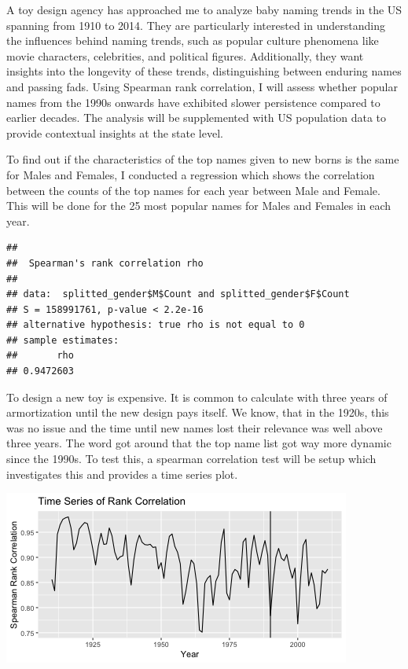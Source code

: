 \documentclass[11pt,preprint, authoryear]{elsarticle}
\let\origfigure\figure
\let\endorigfigure\endfigure
\renewenvironment{figure}[1][2] {
    \expandafter\origfigure\expandafter[H]
} {
    \endorigfigure
}
\numberwithin{equation}{section}
\numberwithin{figure}{section}
\numberwithin{table}{section}
\begin{document}
A toy design agency has approached me to analyze baby naming trends in
the US spanning from 1910 to 2014. They are particularly interested in
understanding the influences behind naming trends, such as popular
culture phenomena like movie characters, celebrities, and political
figures. Additionally, they want insights into the longevity of these
trends, distinguishing between enduring names and passing fads. Using
Spearman rank correlation, I will assess whether popular names from the
1990s onwards have exhibited slower persistence compared to earlier
decades. The analysis will be supplemented with US population data to
provide contextual insights at the state level.

To find out if the characteristics of the top names given to new borns
is the same for Males and Females, I conducted a regression which shows
the correlation between the counts of the top names for each year
between Male and Female. This will be done for the 25 most popular names
for Males and Females in each year.

\begin{verbatim}
## 
##  Spearman's rank correlation rho
## 
## data:  splitted_gender$M$Count and splitted_gender$F$Count
## S = 158991761, p-value < 2.2e-16
## alternative hypothesis: true rho is not equal to 0
## sample estimates:
##       rho 
## 0.9472603
\end{verbatim}

To design a new toy is expensive. It is common to calculate with three
years of armortization until the new design pays itself. We know, that
in the 1920s, this was no issue and the time until new names lost their
relevance was well above three years. The word got around that the top
name list got way more dynamic since the 1990s. To test this, a spearman
correlation test will be setup which investigates this and provides a
time series plot.

\begin{figure}[H]

{\centering \includegraphics{Question1_files/figure-latex/Figure2-1} 

}

\caption{Caption Here \label{Figure2}}\label{fig:Figure2}
\end{figure}
\end{document}
